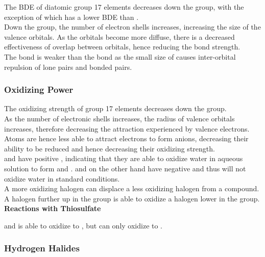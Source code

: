 \documentclass[../main]{subfiles}
\begin{document}
	The BDE of diatomic group 17 elements decreases down the group, with the exception of  which has a lower BDE than . \\

	Down the group, the number of electron shells increases, increasing the size of the valence orbitals. As the orbitals become more diffuse, there is a decreased effectiveness of overlap between orbitals, hence reducing the bond strength. \\

	The  bond is weaker than the  bond as the small size of  causes inter-orbital repulsion of lone pairs and bonded pairs. \\

	\subsubsection{Oxidizing Power}

	The oxidizing strength of group 17 elements decreases down the group. \\

	As the number of electronic shells increases, the radius of valence orbitals increases, therefore decreasing the attraction experienced by valence electrons. Atoms are hence less able to attract electrons to form anions, decreasing their ability to be reduced and hence decreasing their oxidizing strength. \\

	 and  have positive , indicating that they are able to oxidize water in aqueous solution to form  and .  and  on the other hand have negative  and thus will not oxidize water in standard conditions. \\

	A more oxidizing halogen can displace a less oxidizing halogen from a compound. A halogen further up in the group is able to oxidize a halogen lower in the group. \\

	\noindent \textbf{Reactions with Thiosulfate}

	 and  is able to oxidize  to , but  can only oxidize  to .

	\subsubsection{Hydrogen Halides}
\end{document}

